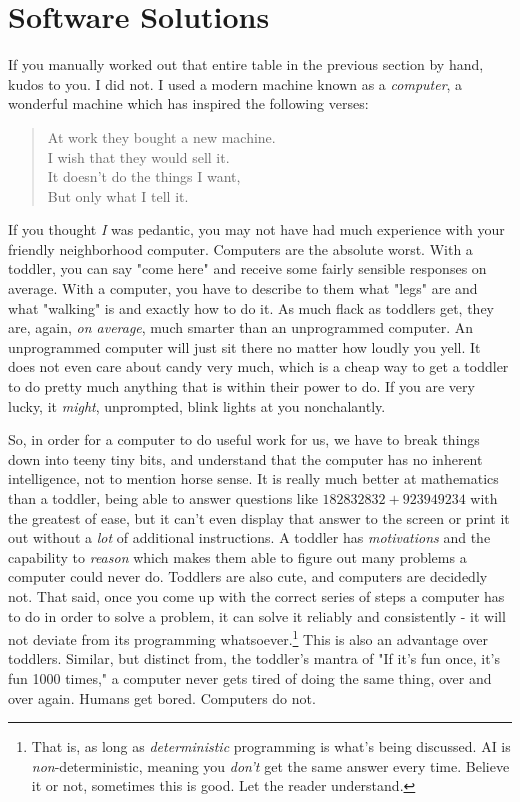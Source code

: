 \ifdefined\embedversion\newpage\fi
\section{Software Solutions}
If you manually worked out that entire table in the previous section by hand, kudos to you.  I did not.  I used a modern machine known as a \textit{computer}, a wonderful machine which has inspired the following verses:
\begin{verse}
At work they bought a new machine. \\
I wish that they would sell it. \\
It doesn't do the things I want, \\
But only what I tell it.
\end{verse}

If you thought \textit{I} was pedantic, you may not have had much experience with your friendly neighborhood computer.  Computers are the absolute worst.  With a toddler, you can say "come here" and receive some fairly sensible responses on average.  With a computer, you have to describe to them what "legs" are and what "walking" is and exactly how to do it.  As much flack as toddlers get, they are, again, \textit{on average}, much smarter than an unprogrammed computer.  An unprogrammed computer will just sit there no matter how loudly you yell.  It does not even care about candy very much, which is a cheap way to get a toddler to do pretty much anything that is within their power to do.  If you are very lucky, it \textit{might}, unprompted, blink lights at you nonchalantly.

So, in order for a computer to do useful work for us, we have to break things down into teeny tiny bits, and understand that the computer has no inherent intelligence, not to mention horse sense.  It is really much better at mathematics than a toddler, being able to answer questions like $182832832 + 923949234$ with the greatest of ease, but it can't even display that answer to the screen or print it out without a \textit{lot} of additional instructions. A toddler has \textit{motivations} and the capability to \textit{reason} which makes them able to figure out many problems a computer could never do.  Toddlers are also cute, and computers are decidedly not.  That said, once you come up with the correct series of steps a computer has to do in order to solve a problem, it can solve it reliably and consistently - it will not deviate from its programming whatsoever.\footnote{That is, as long as \textit{deterministic} programming is what's being discussed.  AI is \textit{non}-deterministic, meaning you \textit{don't} get the same answer every time.  Believe it or not, sometimes this is good.  Let the reader understand.}  This is also an advantage over toddlers.  Similar, but distinct from, the toddler's mantra of "If it's fun once, it's fun 1000 times," a computer never gets tired of doing the same thing, over and over again.  Humans get bored.  Computers do not.

